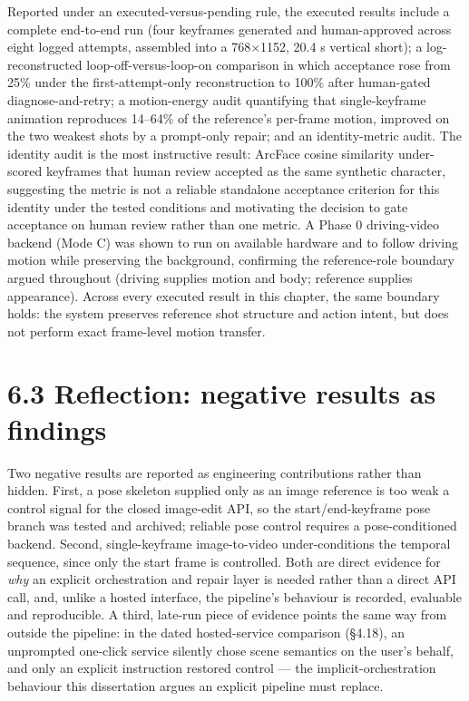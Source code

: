 \documentclass[10pt,twocolumn,letterpaper]{article}
\begin{document}
Reported under an executed-versus-pending rule, the executed results include a complete end-to-end run (four keyframes generated and human-approved across eight logged attempts, assembled into a 768$\times$1152, 20.4 s vertical short); a log-reconstructed loop-off-versus-loop-on comparison in which acceptance rose from 25\% under the first-attempt-only reconstruction to 100\% after human-gated diagnose-and-retry; a motion-energy audit quantifying that single-keyframe animation reproduces 14--64\% of the reference's per-frame motion, improved on the two weakest shots by a prompt-only repair; and an identity-metric audit. The identity audit is the most instructive result: ArcFace cosine similarity under-scored keyframes that human review accepted as the same synthetic character, suggesting the metric is not a reliable standalone acceptance criterion for this identity under the tested conditions and motivating the decision to gate acceptance on human review rather than one metric. A Phase 0 driving-video backend (Mode C) was shown to run on available hardware and to follow driving motion while preserving the background, confirming the reference-role boundary argued throughout (driving supplies motion and body; reference supplies appearance). Across every executed result in this chapter, the same boundary holds: the system preserves reference shot structure and action intent, but does not perform exact frame-level motion transfer.


\section*{6.3 Reflection: negative results as findings}

Two negative results are reported as engineering contributions rather than hidden. First, a pose skeleton supplied only as an image reference is too weak a control signal for the closed image-edit API, so the start/end-keyframe pose branch was tested and archived; reliable pose control requires a pose-conditioned backend. Second, single-keyframe image-to-video under-conditions the temporal sequence, since only the start frame is controlled. Both are direct evidence for \emph{why} an explicit orchestration and repair layer is needed rather than a direct API call, and, unlike a hosted interface, the pipeline's behaviour is recorded, evaluable and reproducible. A third, late-run piece of evidence points the same way from outside the pipeline: in the dated hosted-service comparison (\S{}4.18), an unprompted one-click service silently chose scene semantics on the user's behalf, and only an explicit instruction restored control --- the implicit-orchestration behaviour this dissertation argues an explicit pipeline must replace.
\end{document}
